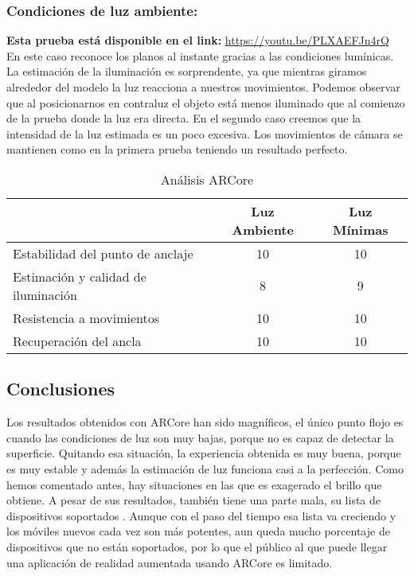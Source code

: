 \subsubsection{Condiciones de luz ambiente:}

\textbf{Esta prueba está disponible en el link:} \url{https://youtu.be/PLXAEFJn4rQ}\\

En este caso reconoce los planos al instante gracias a las condiciones lumínicas. La estimación de la iluminación es sorprendente, ya que mientras giramos alrededor del modelo la luz reacciona a nuestros movimientos. Podemos observar que al posicionarnos en contraluz el objeto está menos iluminado que al comienzo de la prueba donde la luz era directa. En el segundo caso creemos que la intensidad de la luz estimada es un poco excesiva. Los movimientos de cámara se mantienen como en la primera prueba teniendo un resultado perfecto.

\begin{table}[H]
    \centering
      \begin{tabular}{|l|c|c|}
    \hline
          & Luz Ambiente & Luz Mínimas \\
         \hline
        Estabilidad del punto de anclaje   &10 &10\\
        \hline
        Estimación y calidad de iluminación  &8 &9 \\
        \hline
        Resistencia a movimientos  &10 &10 \\
        \hline
        Recuperación del ancla  &10 &10 \\
      \hline
    \end{tabular}
    \caption{Análisis ARCore}
    \label{tab:TARCore}
\end{table}
\subsection{Conclusiones}
Los resultados obtenidos con ARCore han sido magníficos, el único punto flojo es cuando las condiciones de luz son muy bajas, porque no es capaz de detectar la superficie. Quitando esa situación, la experiencia obtenida es muy buena, porque es muy estable y además la estimación de luz funciona casi a la perfección. Como hemos comentado antes, hay situaciones en las que es exagerado el brillo que obtiene. A pesar de sus resultados, también tiene una parte mala, su lista de dispositivos soportados \cite{ARCoreList}. Aunque con el paso del tiempo esa lista va creciendo y los móviles nuevos cada vez son más potentes, aun queda mucho porcentaje de dispositivos que no están soportados, por lo que el público al que puede llegar una aplicación de realidad aumentada usando ARCore es limitado.


